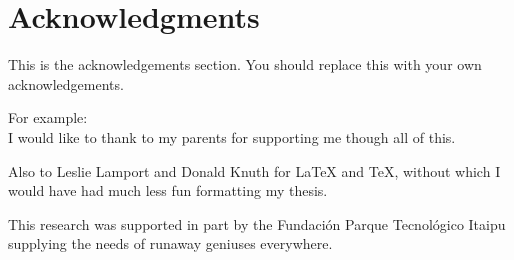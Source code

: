 \section*{Acknowledgments}

This is the acknowledgements section.  You should replace this with your
own acknowledgements.

For example:\\
I would like to thank to my
parents for supporting me though all of this.

Also to Leslie Lamport and Donald Knuth for \LaTeX{} and \TeX{}, without which
I would have had much less fun formatting my thesis.

This research was supported in part by the Fundaci\'on Parque Tecnol\'ogico Itaipu 
supplying the needs of runaway geniuses everywhere.



